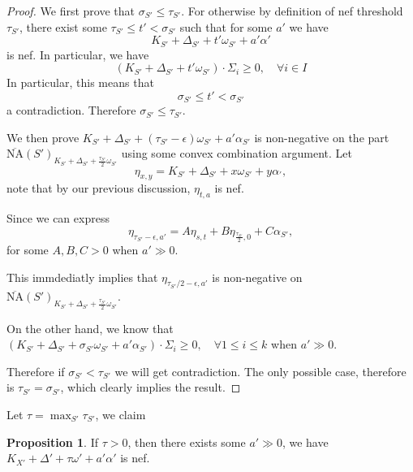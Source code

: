 \documentclass[11pt]{article}
\theoremstyle{definition}
\newtheorem{proposition}[theorem]{Proposition}
\begin{document}
	\begin{proof}
		
		We first prove that $\sigma_{S'}\le \tau_{S'}$. For otherwise by definition of nef threshold $\tau_{S'}$, there exist some $\tau_{S'}\le t'<\sigma_{S'}$ such that for some $a'$ we have $$K_{S'}+ \Delta_{S'} + t' \omega_{S'}+ a' \alpha'$$is nef. In particular, we have $$(K_{S'}+ \Delta_{S'} + t' \omega_{S'}) \cdot \Sigma_i  \ge 0 ,\quad \forall i \in I$$
		In particular, this means that $$\sigma_{S'} \le t ' < \sigma_{S'}$$a contradiction. Therefore $\sigma_{S'} \le \tau_{S'}$.
		
		We then prove $K_{S'} + \Delta_{S'} + (\tau_{S'} - \epsilon)\omega_{S'} + a' \alpha_{S'}$ is non-negative on the part $\overline{\text{NA}}(S')_{K_{S'}+ \Delta_{S'} + \frac{\tau_{S'}}{2} \omega_{S'}}$ using some convex combination argument. Let $$\eta_{x,y} = K_{S'} + \Delta_{S'} + x \omega_{S'} +  y\alpha_{'},$$
		note that by our previous discussion, $\eta_{t,a}$ is nef. 
		
		Since we can express $$\eta_{\tau_{S'}- \epsilon,a'} = A\eta_{s,t}+ B\eta_{\frac{\tau_{S'}}{2},0} + C\alpha_{S'},$$ for some $A
		,B,C >0$ when $a' \gg 0$. 
		
		This immdediatly implies that $\eta_{\tau_{S'}/2-\epsilon, a'}$ is non-negative on $\overline{\text{NA}}(S')_{K_{S'}+ \Delta_{S'} + \frac{\tau_{S'}}{2} \omega_{S'}}$. 
		
		On the other hand, we know that $(K_{S'} + \Delta_{S'} + \sigma_{S'} \omega_{S'} + a' \alpha_{S'})\cdot \Sigma_i \ge 0 ,\quad \forall 1\le i\le k$ when $a' \gg 0$.
		
		Therefore if $\sigma_{S'}< \tau_{S'}$ we will get contradiction. The only possible case, therefore is $\tau_{S'} = \sigma_{S'}$, which clearly implies the result. 
		
	\end{proof}
	Let $\tau =  \max_{S' }\tau_{S'}$, we claim 
	\begin{proposition}
		If $\tau >0$, then there exists some $a'\gg 0$, we have $K_{X'} + \Delta '+\tau \omega ' + a' \alpha'$ is nef.
	\end{proposition}
	
\end{document}
